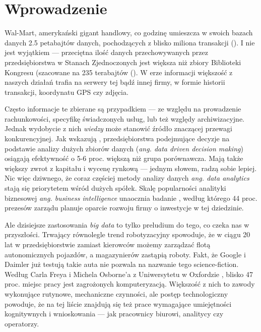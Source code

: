 \documentclass[polish, twoside, 12pt, a4paper]{article}
\theoremstyle{definition}
\theoremstyle{plain}
\theoremstyle{remark}
\begin{document}
\cleardoublepage
\tableofcontents

\cleardoublepage
\section{Wprowadzenie}

Wal-Mart, amerykański gigant handlowy, co godzinę umieszcza w swoich bazach danych 2.5 petabajtów danych, pochodzących z blisko miliona transakcji (\cite{Economist2010}). I nie jest wyjątkiem --- przeciętna ilość danych przechowywanych przez przedsiębiorstwa w Stanach Zjednoczonych jest większa niż zbiory Biblioteki Kongresu (szacowane na 235 terabajtów (\cite{McKinsey2011}). W erze informacji większość z naszych działań trafia na serwery tej bądź innej firmy, w formie historii transakcji, koordynatu GPS czy zdjęcia. 

Często informacje te zbierane są przypadkiem --- ze względu na prowadzenie rachunkowości, specyfikę świadczonych usług, lub też względy archiwizacyjne. Jednak wydobycie z nich \textit{wiedzy} może stanowić źródło znaczącej przewagi konkurencyjnej.  Jak wskazują \cite{Brynjolfsson2011}, przedsiębiorstwa podejmujące decyzje na podstawie analizy dużych zbiorów danych (\textit{ang. data driven decision making}) osiągają efektywność o 5-6 proc. większą niż grupa porównawcza. Mają także większy zwrot z kapitału i wycenę rynkową --- jednym słowem, radzą sobie lepiej. Nic więc dziwnego, że coraz częściej metody analizy danych \textit{ang. data analytics} stają się priorytetem wśród dużych spółek. Skalę popularności analityki biznesowej \textit{ang. business intelligence} unaocznia badanie \cite{PwC2014}, według którego 44 proc. prezesów zarządu planuje oparcie rozwoju firmy o inwestycje w tej dziedzinie. 

Ale dzisiejsze zastosowania \textit{big data} to tylko preludium do tego, co czeka nas w przyszłości. Trwający równolegle trend robotyzacyjny spowoduje, że w ciągu 20 lat w przedsiębiorstwie zamiast kierowców możemy zarządzać flotą autonomicznych pojazdów, a magazynierów zastąpią roboty. Fakt, że Google i Daimler już testują takie auta nie pozwala na nazwanie tego science-fiction. Według Carla Freya i Michela Osborne'a z Uniwersytetu w Oxfordzie \cite{frey2013}, blisko 47 proc. miejsc pracy jest zagrożonych komputeryzacją. Większość z nich to zawody wykonujące rutynowe, mechaniczne czynności, ale postęp technologiczny powoduje, że na tej liście znajdują się też prace wymagające umiejętności kognitywnych i wnioskowania --- jak pracownicy biurowi, analitycy czy operatorzy. 
\end{document}
